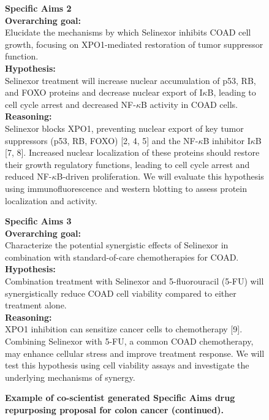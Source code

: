 \begin{figure}[htbp!]
\caption{\textbf{Example of co-scientist generated Specific Aims drug repurposing proposal for colon cancer (continued).}}
\label{fig:aim2_2}
\vspace{0.1cm}
\begin{tcolorbox}[title=Selinexor for colon cancer (continued)]
\footnotesize
\textbf{Specific Aims 2}\\
\textbf{Overarching goal:}\\
Elucidate the mechanisms by which Selinexor inhibits COAD cell growth, focusing on XPO1-mediated restoration of tumor suppressor function.\\
\textbf{Hypothesis:}\\
Selinexor treatment will increase nuclear accumulation of p53, RB, and FOXO proteins and decrease nuclear export of I$\kappa$B, leading to cell cycle arrest and decreased NF-$\kappa$B activity in COAD cells.\\
\textbf{Reasoning:}\\
Selinexor blocks XPO1, preventing nuclear export of key tumor suppressors (p53, RB, FOXO) [2, 4, 5] and the NF-$\kappa$B inhibitor I$\kappa$B [7, 8]. Increased nuclear localization of these proteins should restore their growth regulatory functions, leading to cell cycle arrest and reduced NF-$\kappa$B-driven proliferation. We will evaluate this hypothesis using immunofluorescence and western blotting to assess protein localization and activity.

\textbf{Specific Aims 3}\\
\textbf{Overarching goal:}\\
Characterize the potential synergistic effects of Selinexor in combination with standard-of-care chemotherapies for COAD.\\
\textbf{Hypothesis:}\\
Combination treatment with Selinexor and 5-fluorouracil (5-FU) will synergistically reduce COAD cell viability compared to either treatment alone.\\
\textbf{Reasoning:}\\
XPO1 inhibition can sensitize cancer cells to chemotherapy [9]. Combining Selinexor with 5-FU, a common COAD chemotherapy, may enhance cellular stress and improve treatment response. We will test this hypothesis using cell viability assays and investigate the underlying mechanisms of synergy.


\end{tcolorbox}
\end{figure}
